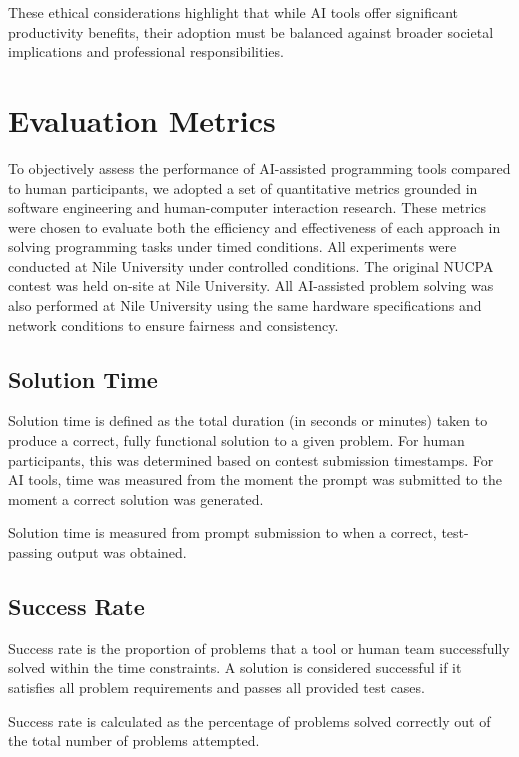 \documentclass[conference]{IEEEtran}
\begin{document}
These ethical considerations highlight that while AI tools offer significant productivity benefits, their adoption must be balanced against broader societal implications and professional responsibilities.

\section{Evaluation Metrics}

To objectively assess the performance of AI-assisted programming tools compared to human participants, we adopted a set of quantitative metrics grounded in software engineering and human-computer interaction research. These metrics were chosen to evaluate both the efficiency and effectiveness of each approach in solving programming tasks under timed conditions. All experiments were conducted at Nile University under controlled conditions. The original NUCPA contest was held on-site at Nile University. All AI-assisted problem solving was also performed at Nile University using the same hardware specifications and network conditions to ensure fairness and consistency.

\subsection{Solution Time}

Solution time is defined as the total duration (in seconds or minutes) taken to produce a correct, fully functional solution to a given problem. For human participants, this was determined based on contest submission timestamps. For AI tools, time was measured from the moment the prompt was submitted to the moment a correct solution was generated.

Solution time is measured from prompt submission to when a correct, test-passing output was obtained.

\subsection{Success Rate}

Success rate is the proportion of problems that a tool or human team successfully solved within the time constraints. A solution is considered successful if it satisfies all problem requirements and passes all provided test cases.

Success rate is calculated as the percentage of problems solved correctly out of the total number of problems attempted.
\end{document}
